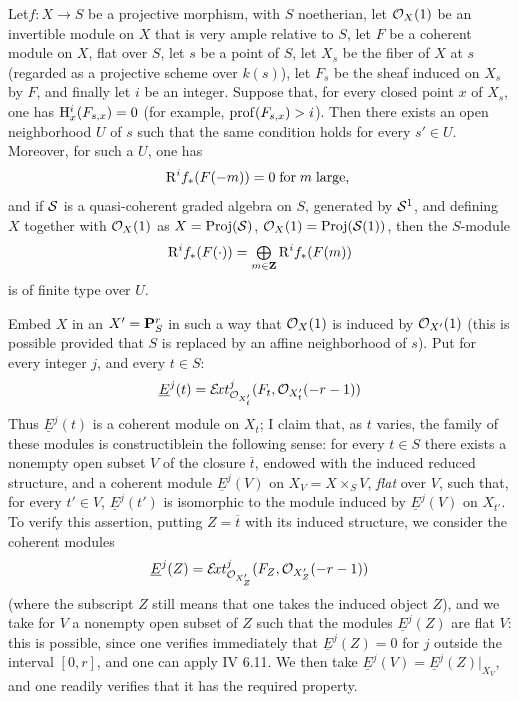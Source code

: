 \begin{proposition} \label{XII.1.5}
Let\pageoriginaled $f:X\to S$ be a projective morphism, with $S$ noetherian, let $\OX(1)$ be an invertible module on $X$ that is very ample relative to $S$, let $F$ be a coherent module on $X$, flat over $S$, let $s$ be a point of $S$, let $X_s$ be the fiber of $X$ at $s$ (regarded as a projective scheme over $k(s)$), let $F_s$ be the sheaf induced on $X_s$ by $F$, and finally let $i$ be an integer. Suppose that, for every closed point $x$ of $X_s$, one has $\H^i_x(F_{s, x})=0$ (for example, $\prof(F_{s, x})>i$). Then there exists an open neighborhood $U$ of $s$ such that the same condition holds for every $s'\in U$. Moreover, for such a $U$, one has
\[
\R^if_\ast(F(-m))= 0 \; \text{for}\; m \; \text{large, }
\]
and if $\Ss$ is a quasi-coherent graded algebra on $S$, generated by $\Ss^1$, and defining~$X$ together with $\OX(1)$ as $X=\Proj(\Ss)$, $\OX(1)=\Proj(\Ss(1))$, then the $S$-module
\[
\R^if_\ast(F(\cdot)) = \sisi{\coprod}{\tbigoplus}_{m\in\ZZ}\R^if_\ast(F(m))
\]
is of finite type over $U$.
\end{proposition}

Embed $X$ in an $X'=\PP_S^r$ in such a way that $\OX(1)$ is induced by $\Oo_{\sisi{P}{{X'}}}(1)$ (this is possible provided that $S$ is replaced by an affine neighborhood of $s$). Put\label{P5} for every integer $j$, and every $t\in S$:
\steco
\begin{equation} \label{eq:XII.7} {}\underline{E}^j(t)= \SheafExt^j_{\Oo_{X'_t}} (F_t, \Oo_{X'_t}(-r-1))
\end{equation}
Thus $\underline{E}^j(t)$ is a coherent module on $X_t$; I claim that, as $t$ varies, the family of these modules is \og constructible\fg in the following sense: for every $t\in S$ there exists a nonempty open subset $V$ of the closure $\overline{t}$, endowed with the induced reduced structure, and a coherent module $\underline{E}^j(V)$ on $X_V=X\times_SV$, \emph{flat} over $V$, such that, for every $t'\in V$, $\underline{E}^j(t')$ is isomorphic to the module induced by $\underline{E}^j(V)$ on $X_{t'}$. To verify this assertion, putting $Z=\overline{t}$ with its induced structure, we consider the coherent modules\pageoriginale
\[
\underline{E}^j(Z)= \SheafExt^j_{\Oo_{X'_Z}} (F_Z, \Oo_{X'_Z}(-r-1))
\]
(where the subscript $Z$ still means that one takes the induced object  $Z$), and we take for $V$ a nonempty open subset of $Z$ such that the modules $\underline{E}^j(Z)$ are flat  $V$: this is possible, since one verifies immediately that $\underline{E}^j(Z)=0$ for $j$ outside the interval $[0, r]$, and one can apply  IV 6.11. We then take $\underline{E}^j(V)=\underline{E}^j(Z)|_{X_V}$, and one readily verifies that it has the required property.

